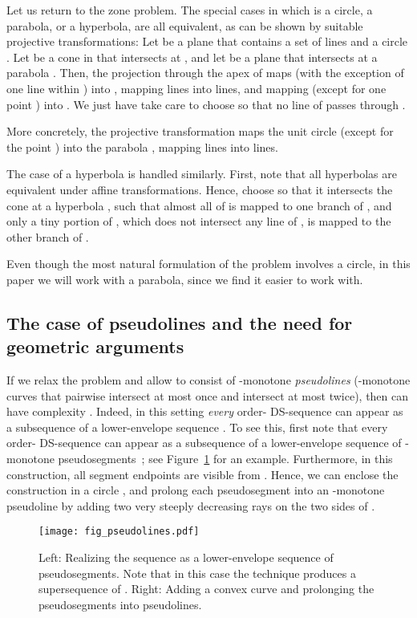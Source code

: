 \documentclass[11pt]{article}
\theoremstyle{definition}
\theoremstyle{remark}
\begin{document}
Let us return to the zone problem. The special cases in which  is a circle, a parabola, or a hyperbola, are all equivalent, as can be shown by suitable projective transformations: Let  be a plane that contains a set of lines  and a circle . Let  be a cone in  that intersects  at , and let  be a plane that intersects  at a parabola . Then, the projection through the apex of  maps  (with the exception of one line within ) into , mapping lines into lines, and mapping  (except for one point ) into . We just have take care to choose  so that no line of  passes through .

More concretely, the projective transformation  maps the unit circle  (except for the point ) into the parabola , mapping lines into lines.

The case of a hyperbola is handled similarly. First, note that all hyperbolas are equivalent under affine transformations. Hence, choose  so that it intersects the cone  at a hyperbola , such that almost all of  is mapped to one branch of , and only a tiny portion of , which does not intersect any line of , is mapped to the other branch of .

Even though the most natural formulation of the problem involves a circle, in this paper we will work with a parabola, since we find it easier to work with.

\subsection{The case of pseudolines and the need for geometric arguments}

If we relax the problem and allow  to consist of -monotone \emph{pseudolines} (-monotone curves that pairwise intersect at most once and intersect  at most twice), then  can have complexity . Indeed, in this setting \emph{every} order- DS-sequence can appear as a subsequence of a lower-envelope sequence . To see this, first note that every order- DS-sequence can appear as a subsequence of a lower-envelope sequence of -monotone pseudosegments~\cite{DS_book}; see Figure~\ref{fig_pseudolines} for an example. Furthermore, in this construction, all segment endpoints are visible from . Hence, we can enclose the construction in a circle , and prolong each pseudosegment  into an -monotone pseudoline by adding two very steeply decreasing rays on the two sides of .

\begin{figure}
\centerline{\texttt{[image: fig\_pseudolines.pdf]}}
\caption{\label{fig_pseudolines}Left: Realizing the sequence  as a lower-envelope sequence of pseudosegments. Note that in this case the technique produces a supersequence of . Right: Adding a convex curve and prolonging the pseudosegments into pseudolines.}
\end{figure}
\end{document}
